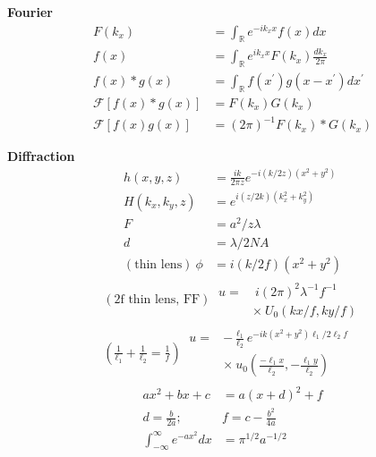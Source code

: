 \documentclass[12pt]{article}
\begin{document}
\begin{multicols}{2}

\textbf{Fourier}
\begin{align}
  F(k_x) &= \int_{\mathbb{R}} e^{-ik_xx} f(x) dx\\
  f(x) &= \int_{\mathbb{R}} e^{ik_xx} F(k_x) \frac{dk_x}{2\pi}\\
  f(x) * g(x) &= \int_{\mathbb{R}} f(x^{\prime}) g(x - x^{\prime}) dx^{\prime}\\
  \mathcal{F}[f(x) * g(x)] &= F(k_x) G(k_x)\\
  \mathcal{F}[f(x)g(x)] &= (2\pi)^{-1} F(k_x) * G(k_x)
\end{align}

\textbf{Diffraction}
\begin{align}
  h(x, y, z) &= \frac{ik}{2\pi z} e^{-i (k / 2z)(x^2 + y^2)}\\
  H(k_x, k_y, z) &= e^{i (z / 2k)(k_x^2 + k_y^2)}\\
  F &= a^2 / z \lambda\\ %
  d &= \lambda / 2 NA\\ %
  (\textrm{thin lens}) \ \phi &= i(k/2f)(x^2+y^2)
\end{align}
\begin{align}
  (\textrm{2f thin lens, FF}) \
  \begin{aligned}
    u = &\ i(2\pi)^2\lambda^{-1}f^{-1}\\
    &\times \ U_0(kx/f,ky/f)
  \end{aligned}\\
  (\frac{1}{\ell_1} + \frac{1}{\ell_2} = \frac{1}{f}) \
  \begin{aligned}
    u = &-\frac{\ell_1}{\ell_2} e^{-ik(x^2+y^2)\ell_1/2\ell_2 f}\\
    &\times \ u_0(\frac{-\ell_1 x}{\ell_2}, -\frac{\ell_1 y}{\ell_2})
  \end{aligned}
\end{align}
\begin{align}
  ax^2 + bx + c &= a(x + d)^2 + f\\
  d = \frac{b}{2a}; \ &f = c - \frac{b^2}{4a}\\
  \int_{-\infty}^{\infty} e^{-ax^2} dx &= \pi^{1/2}a^{-1/2}
\end{align}


\end{multicols}
\end{document}
